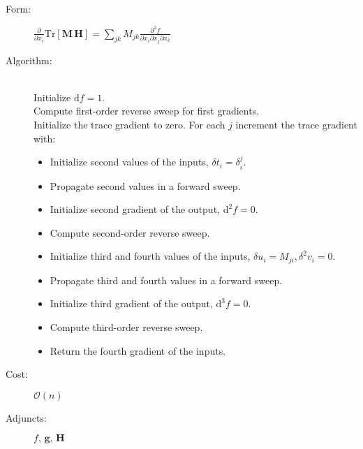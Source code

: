 \begin{tcolorbox}[colback=white,colframe=gray90, coltitle=black,boxrule=3pt,
fonttitle=\bfseries,title=Gradient of the Trace of a Matrix Hessian Product]
	
	\begin{description}
		\item[Form:] 
		$\displaystyle \frac{\partial}{\partial x_{i} } \mathrm{Tr} \! \left[ \mathbf{M} \, \mathbf{H} \right]
		= \sum_{jk} M_{jk} \frac{ \partial^{3} f }{ \partial x_{i}  \partial x_{j}  \partial x_{k} } $
		\item[Algorithm:] \hfill \\
		Initialize $\mathrm{d} f = 1$. \\
		Compute first-order reverse sweep for first gradients. \\
		Initialize the trace gradient to zero.
		For each $j$ increment the trace gradient with:
		\begin{itemize}
			\setlength{\itemsep}{0cm}
			\setlength{\parskip}{0cm}
			\item[] Initialize second values of the inputs, $\delta t_{i} = \delta^{j}_{i}$.
			\item[] Propagate second values in a forward sweep. 
			\item[] Initialize second gradient of the output, $\mathrm{d}^{2} f = 0$.
			\item[] Compute second-order reverse sweep.
			\item[] Initialize third and fourth values of the inputs, $\delta u_{i} = M_{ji}, \delta^{2} v_{i} = 0$.
			\item[] Propagate third and fourth values in a forward sweep.
			\item[] Initialize third gradient of the output, $\mathrm{d}^{3} f = 0$.
			\item[] Compute third-order reverse sweep.
			\item[] Return the fourth gradient of the inputs.
		\end{itemize}
		\item[Cost:] $\mathcal{O} \! \left( n \right)$
		\item[Adjuncts:] $ f, \, \mathbf{g}, \, \mathbf{H}$
	\end{description}
	
\end{tcolorbox}

